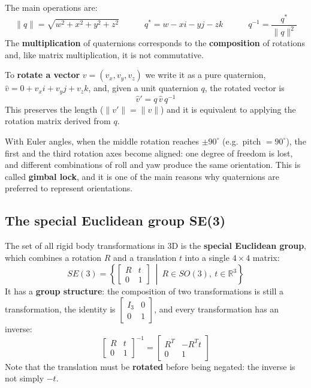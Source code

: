 The main operations are:
\[
\|q\| = \sqrt{w^2 + x^2 + y^2 + z^2} \qquad\quad
q^* = w - xi - yj - zk \qquad\quad
q^{-1} = \frac{q^*}{\|q\|^2}
\]
The \textbf{multiplication} of quaternions corresponds to the \textbf{composition} of rotations and, like matrix multiplication, it is not commutative.

To \textbf{rotate a vector} $v = (v_x, v_y, v_z)$ we write it as a pure quaternion, $\hat{v} = 0 + v_x i + v_y j + v_z k$, and, given a unit quaternion $q$, the rotated vector is
\[
\hat{v}' = q\,\hat{v}\,q^{-1}
\]
This preserves the length ($\|v'\| = \|v\|$) and it is equivalent to applying the rotation matrix derived from $q$.

\begin{infobox}
With Euler angles, when the middle rotation reaches $\pm 90^\circ$ (e.g.\ pitch $= 90^\circ$), the first and the third rotation axes become aligned: one degree of freedom is lost, and different combinations of roll and yaw produce the same orientation. This is called \textbf{gimbal lock}, and it is one of the main reasons why quaternions are preferred to represent orientations.
\end{infobox}

\subsection{The special Euclidean group SE(3)}
The set of all rigid body transformations in 3D is the \textbf{special Euclidean group}, which combines a rotation $R$ and a translation $t$ into a single $4\times4$ matrix:
\[
SE(3) = \left\{ \begin{bmatrix} R & t \\ 0 & 1 \end{bmatrix} \ \middle|\ R \in SO(3),\ t \in \mathbb{R}^3 \right\}
\]
It has a \textbf{group structure}: the composition of two transformations is still a transformation, the identity is $\begin{bmatrix} I_3 & 0 \\ 0 & 1 \end{bmatrix}$, and every transformation has an inverse:
\[
\begin{bmatrix} R & t \\ 0 & 1 \end{bmatrix}^{-1} = \begin{bmatrix} R^T & -R^T t \\ 0 & 1 \end{bmatrix}
\]
Note that the translation must be \textbf{rotated} before being negated: the inverse is not simply $-t$.


